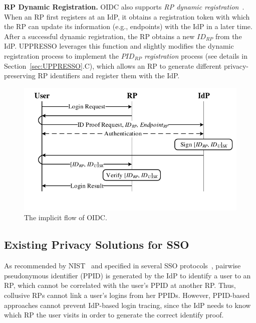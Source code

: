 \vspace{0.5mm}
\noindent\textbf{RP Dynamic Registration.}
OIDC also supports {\em RP dynamic registration}~\cite{DynamicRegistration}. When an RP first registers at an IdP, it obtains a registration token with which the RP can %
update its information (e.g., endpoints) with the IdP in a later time. After a successful dynamic registration, the RP obtains a new $ID_{RP}$ from the IdP.
UPPRESSO leverages this function and slightly modifies the dynamic registration process to implement the {\em $PID_{RP}$ registration} process (see details in Section~\ref{sec:UPPRESSO}.C), which allows an RP to generate different privacy-preserving RP identifiers and register them with the IdP.

\begin{figure}[t]
  \centering
  \includegraphics[width=0.9\linewidth]{fig/OIDC1.pdf}
  \caption{The implicit flow of OIDC.}
  \label{fig:OpenID}
  \vspace{-5mm}
\end{figure}

\subsection{Existing Privacy Solutions for SSO}
\label{subsec-solutions}
As recommended by NIST~\cite{NIST2017draft} and specified in several SSO protocols~\cite{OpenIDConnect, SAMLIdentifier}, pairwise pseudonymous identifier (PPID) is generated by the IdP to identify a user to an RP, which cannot be correlated with the user's PPID at another RP. Thus, collusive RPs cannot link a user's logins from her PPIDs. However, PPID-based approaches cannot prevent IdP-based login tracing, since the IdP needs to know which RP the user visits in order to generate the correct identify proof. 

